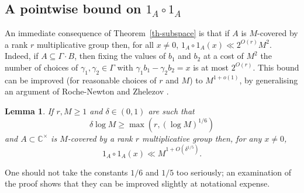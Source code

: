 \documentclass{amsart}
\renewcommand{\geq}{\geqslant}
\newcommand{\bbc}{\mathbb{C}}
\newtheorem{lemma}{Lemma}
\theoremstyle{definition}
\begin{document}
\subsection{A pointwise bound on $1_A\circ 1_A$}
An immediate consequence of Theorem~\ref{th-subspace} is that if $A$ is $M$-covered by a rank $r$ multiplicative group then, for all $x\neq 0$, $1_A\circ 1_A(x) \ll 2^{O(r)}M^2$. Indeed, if $A\subseteq \Gamma\cdot B$, then fixing the values of $b_1$ and $b_2$ at a cost of $M^2$ the number of choices of $\gamma_1,\gamma_2\in \Gamma$ with $\gamma_1b_1-\gamma_2b_2=x$ is at most $2^{O(r)}$. This bound can be improved (for reasonable choices of $r$ and $M$) to $M^{1+o(1)}$, by generalising an argument of Roche-Newton and Zhelezov \cite{RoZh15}.
\begin{lemma}\label{lem-point}
If $r,M\geq 1$ and $\delta\in (0,1)$ are such that 
\[\delta \log M \geq \max(r, (\log M)^{1/6})\]
and $A\subset \bbc^\times$ is $M$-covered by a rank $r$ multiplicative group then, for any $x\neq 0$, 
\[1_A\circ 1_A(x)\ll M^{1+O(\delta^{1/5})}.\]
\end{lemma}
One should not take the constants $1/6$ and $1/5$ too seriously; an examination of the proof shows that they can be improved slightly at notational expense.
\end{document}

